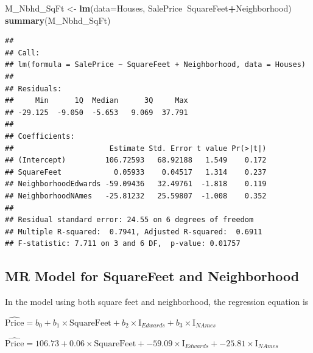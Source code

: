 \documentclass[]{book}
\newenvironment{Shaded}{\begin{snugshade}}{\end{snugshade}}
\newcommand{\KeywordTok}[1]{\textcolor[rgb]{0.13,0.29,0.53}{\textbf{#1}}}
\newcommand{\DataTypeTok}[1]{\textcolor[rgb]{0.13,0.29,0.53}{#1}}
\newcommand{\StringTok}[1]{\textcolor[rgb]{0.31,0.60,0.02}{#1}}
\newcommand{\OperatorTok}[1]{\textcolor[rgb]{0.81,0.36,0.00}{\textbf{#1}}}
\newcommand{\NormalTok}[1]{#1}
\begin{document}
\begin{Shaded}
\begin{Highlighting}[]
\NormalTok{M_Nbhd_SqFt <-}\StringTok{ }\KeywordTok{lm}\NormalTok{(}\DataTypeTok{data=}\NormalTok{Houses, SalePrice}\OperatorTok{~}\NormalTok{SquareFeet}\OperatorTok{+}\NormalTok{Neighborhood)}
\KeywordTok{summary}\NormalTok{(M_Nbhd_SqFt)}
\end{Highlighting}
\end{Shaded}

\begin{verbatim}
## 
## Call:
## lm(formula = SalePrice ~ SquareFeet + Neighborhood, data = Houses)
## 
## Residuals:
##     Min      1Q  Median      3Q     Max 
## -29.125  -9.050  -5.653   9.069  37.791 
## 
## Coefficients:
##                      Estimate Std. Error t value Pr(>|t|)
## (Intercept)         106.72593   68.92188   1.549    0.172
## SquareFeet            0.05933    0.04517   1.314    0.237
## NeighborhoodEdwards -59.09436   32.49761  -1.818    0.119
## NeighborhoodNAmes   -25.81232   25.59807  -1.008    0.352
## 
## Residual standard error: 24.55 on 6 degrees of freedom
## Multiple R-squared:  0.7941, Adjusted R-squared:  0.6911 
## F-statistic: 7.711 on 3 and 6 DF,  p-value: 0.01757
\end{verbatim}

\subsection{MR Model for SquareFeet and
Neighborhood}\label{mr-model-for-squarefeet-and-neighborhood}

In the model using both square feet and neighborhood, the regression
equation is

\(\widehat{\text{Price}}= b_0+ b_1 \times\text{SquareFeet}+ b_2\times\text{I}_{Edwards} + b_3 \times\text{I}_{NAmes}\)

\(\widehat{\text{Price}}= 106.73+ 0.06 \times\text{SquareFeet}+ -59.09 \times\text{I}_{Edwards} +-25.81 \times\text{I}_{NAmes}\)
\end{document}
